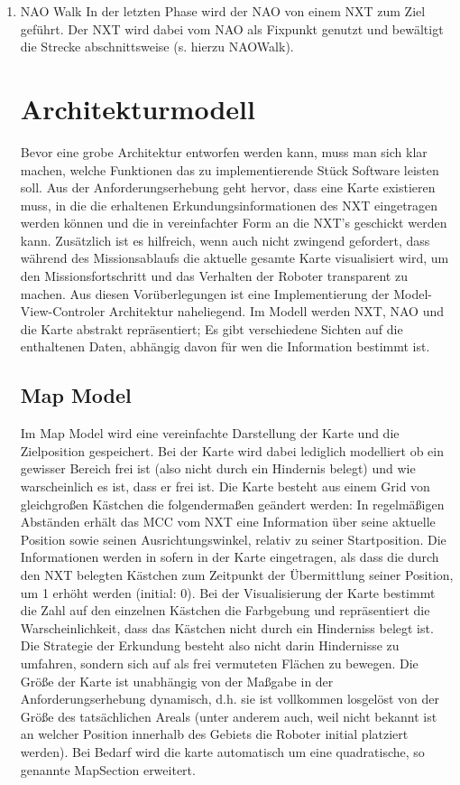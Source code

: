\begin{enumerate}
\item NAO Walk
In der letzten Phase wird der NAO von einem NXT zum Ziel geführt. Der NXT wird dabei vom NAO als Fixpunkt genutzt und bewältigt die Strecke abschnittsweise (s. hierzu NAOWalk).


\section{Architekturmodell}
Bevor eine grobe Architektur entworfen werden kann, muss man sich klar machen, welche Funktionen das zu implementierende Stück Software leisten soll. Aus der Anforderungserhebung geht hervor, dass eine Karte existieren muss, in die die erhaltenen Erkundungsinformationen des NXT eingetragen werden können und die in vereinfachter Form an die NXT's geschickt werden kann. Zusätzlich ist es hilfreich, wenn auch nicht zwingend gefordert, dass während des Missionsablaufs die aktuelle gesamte Karte visualisiert wird, um den Missionsfortschritt und das Verhalten der Roboter transparent zu machen.
Aus diesen Vorüberlegungen ist eine Implementierung der Model-View-Controler Architektur naheliegend. Im Modell werden NXT, NAO und die Karte abstrakt repräsentiert; Es gibt verschiedene Sichten auf die enthaltenen Daten, abhängig davon für wen die Information bestimmt ist.

\subsection{Map Model}
Im Map Model wird eine vereinfachte Darstellung der Karte und die Zielposition gespeichert. Bei der Karte wird dabei lediglich modelliert ob ein gewisser Bereich frei ist (also nicht durch ein Hindernis belegt) und wie warscheinlich es ist, dass er frei ist. Die Karte besteht aus einem Grid von gleichgroßen Kästchen die folgendermaßen geändert werden: In regelmäßigen Abständen erhält das MCC vom NXT eine Information über seine aktuelle Position sowie seinen Ausrichtungswinkel, relativ zu seiner Startposition. Die Informationen werden in sofern in der Karte eingetragen, als dass die durch den NXT belegten Kästchen zum Zeitpunkt der Übermittlung seiner Position, um 1 erhöht werden (initial: 0). Bei der Visualisierung der Karte bestimmt die Zahl auf den einzelnen Kästchen die Farbgebung und repräsentiert die Warscheinlichkeit, dass das Kästchen nicht durch ein Hinderniss belegt ist. Die Strategie der Erkundung besteht also nicht darin Hindernisse zu umfahren, sondern sich auf als frei vermuteten Flächen zu bewegen. Die Größe der Karte ist unabhängig von der Maßgabe in der Anforderungserhebung dynamisch, d.h. sie ist vollkommen losgelöst von der Größe des tatsächlichen Areals (unter anderem auch, weil nicht bekannt ist an welcher Position innerhalb des Gebiets die Roboter initial platziert werden). Bei Bedarf wird die karte automatisch um eine quadratische, so genannte MapSection erweitert.


\end{enumerate}
